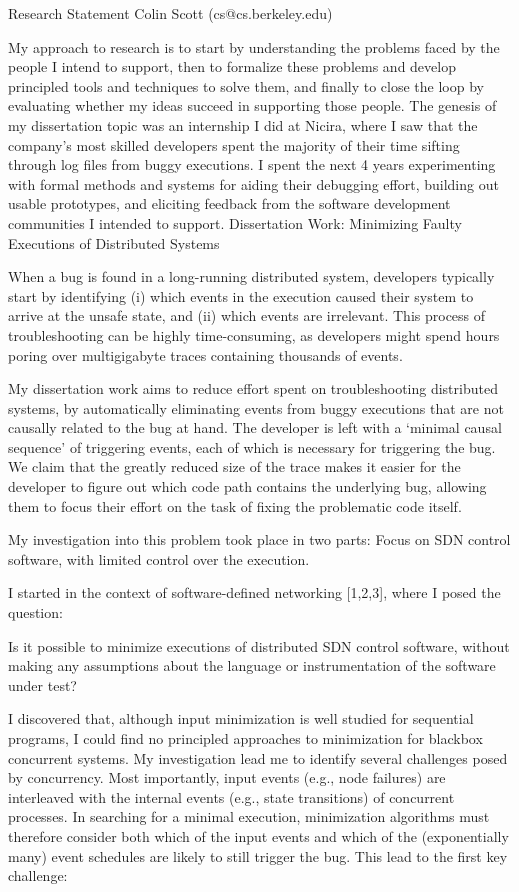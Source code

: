 Research Statement
Colin Scott (cs@cs.berkeley.edu)

My approach to research is to start by understanding the problems faced by the people I intend to support, then to formalize these problems and develop principled tools and techniques to solve them, and finally to close the loop by evaluating whether my ideas succeed in supporting those people. The genesis of my dissertation topic was an internship I did at Nicira, where I saw that the company’s most skilled developers spent the majority of their time sifting through log files from buggy executions. I spent the next 4 years experimenting with formal methods and systems for aiding their debugging effort, building out usable prototypes, and eliciting feedback from the software development communities I intended to support.
Dissertation Work: Minimizing Faulty Executions of Distributed Systems

When a bug is found in a long-running distributed system, developers typically start by identifying (i) which events in the execution caused their system to arrive at the unsafe state, and (ii) which events are irrelevant. This process of troubleshooting can be highly time-consuming, as developers might spend hours poring over multigigabyte traces containing thousands of events.

My dissertation work aims to reduce effort spent on troubleshooting distributed systems, by automatically eliminating events from buggy executions that are not causally related to the bug at hand. The developer is left with a `minimal causal sequence' of triggering events, each of which is necessary for triggering the bug. We claim that the greatly reduced size of the trace makes it easier for the developer to figure out which code path contains the underlying bug, allowing them to focus their effort on the task of fixing the problematic code itself.

My investigation into this problem took place in two parts:
Focus on SDN control software, with limited control over the execution.

I started in the context of software-defined networking [1,2,3], where I posed the question:

Is it possible to minimize executions of distributed SDN control software, without making any assumptions about the language or instrumentation of the software under test?

I discovered that, although input minimization is well studied for sequential programs, I could find no principled approaches to minimization for blackbox concurrent systems. My investigation lead me to identify several challenges posed by concurrency. Most importantly, input events (e.g., node failures) are interleaved with the internal events (e.g., state transitions) of concurrent processes. In searching for a minimal execution, minimization algorithms must therefore consider both which of the input events and which of the (exponentially many) event schedules are likely to still trigger the bug. This lead to the first key challenge: 

